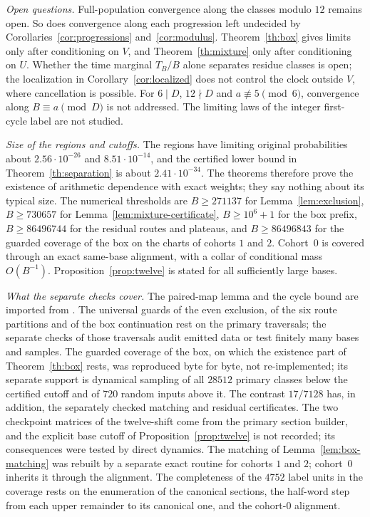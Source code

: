 \documentclass[11pt,reqno]{amsart}
\theoremstyle{remark}
\begin{document}
\emph{Open questions.} Full-population convergence along the classes modulo \(12\) remains open. So does convergence along each progression left undecided by Corollaries~\ref{cor:progressions} and~\ref{cor:modulus}. Theorem~\ref{th:box} gives limits only after conditioning on \(V\), and Theorem~\ref{th:mixture} only after conditioning on \(U\). Whether the time marginal \(T_B/B\) alone separates residue classes is open; the localization in Corollary~\ref{cor:localized} does not control the clock outside \(V\), where cancellation is possible. For \(6\mid D\), \(12\nmid D\) and \(a\not\equiv5\pmod6\), convergence along \(B\equiv a\pmod D\) is not addressed. The limiting laws of the integer first-cycle label are not studied.

\emph{Size of the regions and cutoffs.} The regions have limiting original probabilities about \(2.56\cdot10^{-26}\) and \(8.51\cdot10^{-14}\), and the certified lower bound in Theorem~\ref{th:separation} is about \(2.41\cdot10^{-34}\). The theorems therefore prove the existence of arithmetic dependence with exact weights; they say nothing about its typical size. The numerical thresholds are \(B\ge271137\) for Lemma~\ref{lem:exclusion}, \(B\ge730657\) for Lemma~\ref{lem:mixture-certificate}, \(B\ge10^6+1\) for the box prefix, \(B\ge86496744\) for the residual routes and plateaus, and \(B\ge86496843\) for the guarded coverage of the box on the charts of cohorts \(1\) and \(2\). Cohort~\(0\) is covered through an exact same-base alignment, with a collar of conditional mass \(O(B^{-1})\). Proposition~\ref{prop:twelve} is stated for all sufficiently large bases.

\emph{What the separate checks cover.} The paired-map lemma and the cycle bound are imported from \cite{G6}. The universal guards of the even exclusion, of the six route partitions and of the box continuation rest on the primary traversals; the separate checks of those traversals audit emitted data or test finitely many bases and samples. The guarded coverage of the box, on which the existence part of Theorem~\ref{th:box} rests, was reproduced byte for byte, not re-implemented; its separate support is dynamical sampling of all \(28512\) primary classes below the certified cutoff and of \(720\) random inputs above it. The contrast \(17/7128\) has, in addition, the separately checked matching and residual certificates. The two checkpoint matrices of the twelve-shift come from the primary section builder, and the explicit base cutoff of Proposition~\ref{prop:twelve} is not recorded; its consequences were tested by direct dynamics. The matching of Lemma~\ref{lem:box-matching} was rebuilt by a separate exact routine for cohorts \(1\) and \(2\); cohort~\(0\) inherits it through the alignment. The completeness of the \(4752\) label units in the coverage rests on the enumeration of the canonical sections, the half-word step from each upper remainder to its canonical one, and the cohort-\(0\) alignment.
\end{document}
